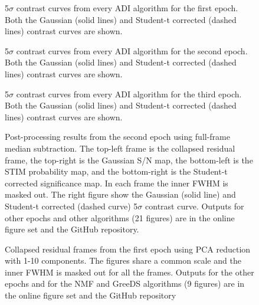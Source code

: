 
\begin{figure}[h!]
    \centering
    \caption{5$\sigma$ contrast curves from every ADI algorithm for the first epoch. Both the Gaussian (solid lines) and Student-t corrected (dashed lines) contrast curves are shown. }
\end{figure}

\begin{figure}[h!]
    \centering
    \caption{5$\sigma$ contrast curves from every ADI algorithm for the second epoch. Both the Gaussian (solid lines) and Student-t corrected (dashed lines) contrast curves are shown. }
\end{figure}

\begin{figure}[h!]
    \centering
    \caption{5$\sigma$ contrast curves from every ADI algorithm for the third epoch. Both the Gaussian (solid lines) and Student-t corrected (dashed lines) contrast curves are shown. }
\end{figure}




\begin{figure}[h!]
    \centering
    \caption{Post-processing results from the second epoch using full-frame median subtraction. The top-left frame is the collapsed residual frame, the top-right is the Gaussian S/N map, the bottom-left is the STIM probability map, and the bottom-right is the Student-t corrected significance map. In each frame the inner FWHM is masked out. The right figure show the Gaussian (solid line) and Student-t corrected (dashed curve) 5$\sigma$ contrast curve. Outputs for other epochs and other algorithms (21 figures) are in the online figure set and the GitHub repository.}
\end{figure}



\begin{figure}[h!]
    \centering
    \caption{Collapsed residual frames from the first epoch using PCA reduction with 1-10 components. The figures share a common scale and the inner FWHM is masked out for all the frames. Outputs for the other epochs and for the NMF and GreeDS algorithms (9 figures) are in the online figure set and the GitHub repository}
\end{figure}

